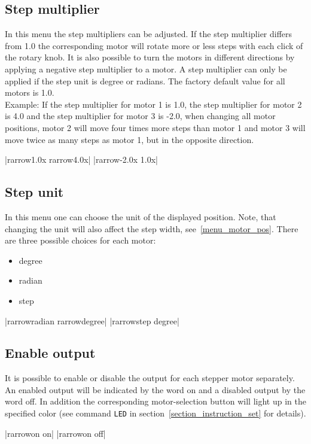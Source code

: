 \subsection{Step multiplier}
In this menu the step multipliers can be adjusted. If the step multiplier differs from 1.0 the corresponding motor will rotate more or less steps with each click of the rotary knob. It is also possible to turn the motors in different directions by applying a negative step multiplier to a motor. A step multiplier can only be applied if the step unit is degree or radians. The factory default value for all motors is 1.0.\\
Example: If the step multiplier for motor 1 is 1.0, the step multiplier for motor 2 is 4.0 and the step multiplier for motor 3 is -2.0, when changing all motor positions, motor 2 will move four times more steps than motor 1 and motor 3 will move twice as many steps as motor 1, but in the opposite direction. 
\begin{center}
  |{rarrow}1.0x   {rarrow}4.0x|
             |{rarrow}-2.0x   1.0x|
\end{center}

\subsection{Step unit}
\label{chp:change_step_unit}
In this menu one can choose the unit of the displayed position. Note, that changing the unit will also affect the step width, see~\ref{menu_motor_pos}. There are three possible choices for each motor:
\begin{itemize}
\item degree
\item radian
\item step
\end{itemize}
\begin{center}
  |{rarrow}radian {rarrow}degree|
             |{rarrow}step    degree|
\end{center}

\subsection{Enable output}
It is possible to enable or disable the output for each stepper motor separately. An enabled output will be indicated by the word on and a disabled output by the word off. In addition the corresponding motor-selection button will light up in the specified color (see command \texttt{LED} in section~\ref{section_instruction_set} for details).
\begin{center}
  |{rarrow}on      on|
             |{rarrow}on      off|
\end{center}


